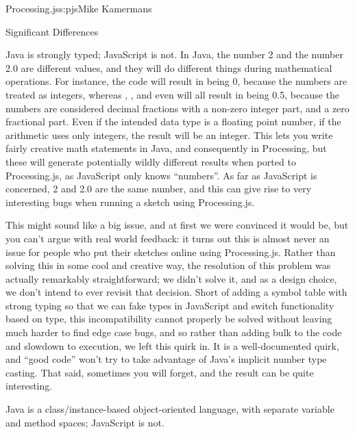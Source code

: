 \begin{aosachapter}{Processing.js}{s:pjs}{Mike Kamermans}
\begin{aosasect1}{Significant Differences}
\begin{aosasect3}{Java is strongly typed; JavaScript is not.}
In Java, the number 2 and the number 2.0 are different values, and
they will do different things during mathematical operations. For
instance, the code  will result in  being 0,
because the numbers are treated as integers, whereas ,
, and even  will all result in
 being 0.5, because the numbers are considered decimal
fractions with a non-zero integer part, and a zero fractional part. Even if
the intended data type is a floating point number, if the arithmetic
uses only integers, the result will be an integer. This lets you write
fairly creative math statements in Java, and consequently in
Processing, but these will generate potentially wildly different
results when ported to Processing.js, as JavaScript only knows
``numbers''. As far as JavaScript is concerned, 2 and 2.0 are the same
number, and this can give rise to very interesting bugs when running a
sketch using Processing.js.

This might sound like a big issue, and at first we were convinced it
would be, but you can't argue with real world feedback: it turns out
this is almost never an issue for people who put their sketches online
using Processing.js. Rather than solving this in some cool and
creative way, the resolution of this problem was actually remarkably
straightforward; we didn't solve it, and as a design choice, we don't
intend to ever revisit that decision. Short of adding a symbol table
with strong typing so that we can fake types in JavaScript and switch
functionality based on type, this incompatibility cannot properly be
solved without leaving much harder to find edge case bugs, and so
rather than adding bulk to the code and slowdown to execution, we left
this quirk in. It is a well-documented quirk, and ``good code'' won't
try to take advantage of Java's implicit number type casting. That
said, sometimes you will forget, and the result can be quite
interesting.

\end{aosasect3}

\begin{aosasect3}{Java is a class/instance-based object-oriented language, with separate variable and method spaces; JavaScript is not.}


\end{aosasect3}
\end{aosasect1}
\end{aosachapter}
